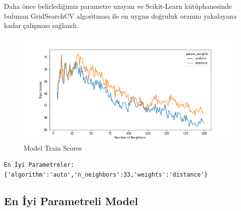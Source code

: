 \documentclass[12pt,twoside]{deuthesis}
\begin{document}
Daha önce belirlediğimiz parametre uzayını ve Scikit-Learn kütüphanesinde bulunan GridSearchCV algoritması ile en uygun doğruluk oranını yakalayana kadar çalışması sağlandı.
\begin{figure}

{\centering \includegraphics[width=1.1\linewidth,height=0.55\textheight]{figure/KNN_Grid_Graph} 

}

\caption{Model Train Scores}\label{fig:unnamed-chunk-13}
\end{figure}
\begin{verbatim}
En İyi Parametreler:{'algorithm':'auto','n_neighbors':33,'weights':'distance'}
\end{verbatim}
\hypertarget{en-iyi-parametreli-model}{%
\subsection{En İyi Parametreli Model}\label{en-iyi-parametreli-model}}
\end{document}
